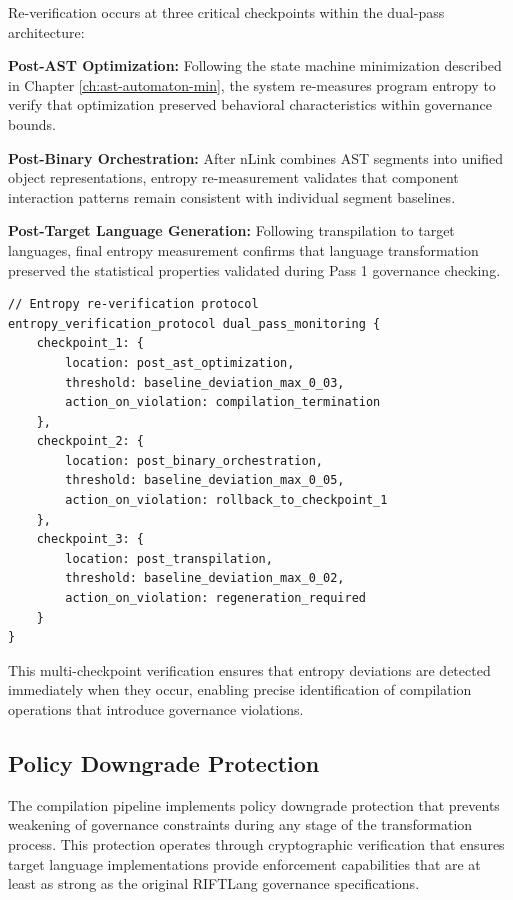 Re-verification occurs at three critical checkpoints within the dual-pass architecture:

\textbf{Post-AST Optimization:} Following the state machine minimization described in Chapter \ref{ch:ast-automaton-min}, the system re-measures program entropy to verify that optimization preserved behavioral characteristics within governance bounds.

\textbf{Post-Binary Orchestration:} After nLink combines AST segments into unified object representations, entropy re-measurement validates that component interaction patterns remain consistent with individual segment baselines.

\textbf{Post-Target Language Generation:} Following transpilation to target languages, final entropy measurement confirms that language transformation preserved the statistical properties validated during Pass 1 governance checking.

\begin{lstlisting}[style=riftlang, language=rift]
// Entropy re-verification protocol
entropy_verification_protocol dual_pass_monitoring {
    checkpoint_1: {
        location: post_ast_optimization,
        threshold: baseline_deviation_max_0_03,
        action_on_violation: compilation_termination
    },
    checkpoint_2: {
        location: post_binary_orchestration,
        threshold: baseline_deviation_max_0_05,
        action_on_violation: rollback_to_checkpoint_1
    },
    checkpoint_3: {
        location: post_transpilation,
        threshold: baseline_deviation_max_0_02,
        action_on_violation: regeneration_required
    }
}
\end{lstlisting}

This multi-checkpoint verification ensures that entropy deviations are detected immediately when they occur, enabling precise identification of compilation operations that introduce governance violations.

\subsection{Policy Downgrade Protection}

The compilation pipeline implements policy downgrade protection that prevents weakening of governance constraints during any stage of the transformation process. This protection operates through cryptographic verification that ensures target language implementations provide enforcement capabilities that are at least as strong as the original RIFTLang governance specifications.

